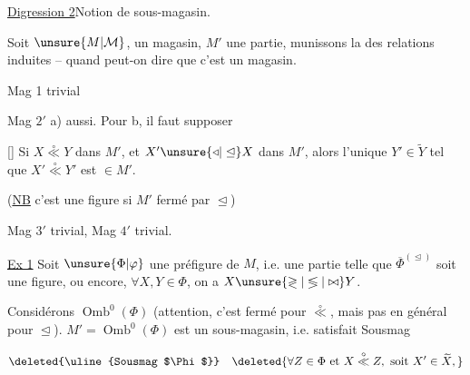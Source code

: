
\uline{Digression 2}\quad Notion de sous-magasin.

Soit $\unsure{M|\mathcal M}$, \inserted{$\trianglelefteq,\overset{\circ}{\ll},|\circ|$} un magasin, $M'$ une partie, munissons la des relations induites -- quand peut-on dire que c'est un magasin.

Mag 1 trivial

Mag $2'$ a) aussi. Pour b, il faut supposer

[] Si $X\overset{\circ}{\ll}Y$ dans $M'$, et $X'\unsure{\triangleleft|\trianglelefteq}X$ dans $M'$, alors l'unique $Y'\in\widetilde Y$ tel que $X'\overset{\circ}{\ll}Y'$ est $\in M'$.

(\uline{NB} c'est une figure si $M'$ fermé par $\trianglelefteq$)

Mag $3'$ trivial, Mag $4'$ trivial.

\uline{Ex 1} Soit $\unsure{\Phi|\varphi}$  une préfigure de $M$, i.e. une partie telle que $\overline\Phi^{(\trianglelefteq)}$ soit une figure, ou encore,  $\forall X,Y\in\Phi$, on a $X\unsure{\gtrless|\lessgtr|\bowtie}Y$.

Considérons $\operatorname{Omb}^{0}(\Phi)$ (attention, c'est fermé pour $\overset{\circ}{\ll}$, mais pas en général pour $\trianglelefteq$).   $M'=\operatorname{Omb}^{0}(\Phi)$ est un sous-magasin, i.e. satisfait Sousmag

\[
\text{\deleted{\uline{Sousmag $\Phi$}}}\quad
\deleted{\forall Z\in\Phi\text{ et }X\overset{\circ}{\ll}Z,\text{ soit }X'\in\widetilde X,}
\]
